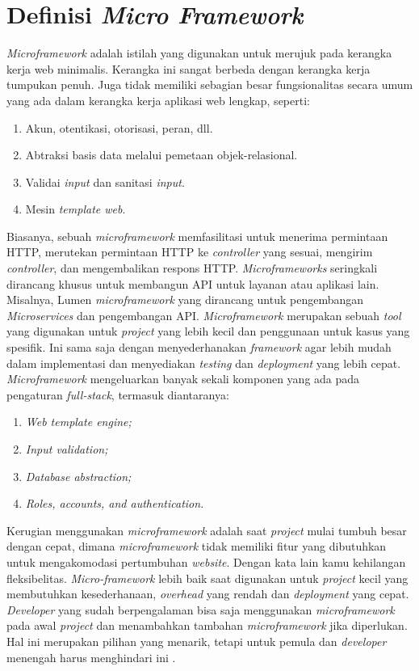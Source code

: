 ﻿\section{Definisi \textit{Micro Framework}}

\textit{Microframework} adalah istilah yang digunakan untuk merujuk pada kerangka kerja web minimalis. Kerangka ini sangat berbeda dengan kerangka kerja tumpukan penuh. Juga tidak memiliki sebagian besar fungsionalitas secara umum yang ada dalam kerangka kerja aplikasi web lengkap, seperti:
\begin{enumerate}
\item Akun, otentikasi, otorisasi, peran, dll.
\item Abtraksi basis data melalui pemetaan objek-relasional.
\item Validai  \textit{input} dan sanitasi \textit{input}.
\item Mesin \textit{template web}.
\end{enumerate}

Biasanya, sebuah \textit{microframework} memfasilitasi untuk menerima permintaan HTTP, merutekan permintaan HTTP ke \textit{controller} yang sesuai, mengirim \textit{controller}, dan mengembalikan respons HTTP. \textit{Microframeworks} seringkali dirancang khusus untuk membangun API untuk layanan atau aplikasi lain. Misalnya, Lumen \textit{microframework} yang dirancang untuk pengembangan \textit{Microservices} dan pengembangan API. \textit{Microframework} merupakan sebuah \textit{tool} yang digunakan untuk \textit{project} yang lebih kecil dan penggunaan untuk kasus yang spesifik. Ini sama saja dengan menyederhanakan \textit{framework} agar lebih mudah dalam implementasi dan menyediakan \textit{testing} dan \textit{deployment} yang lebih cepat. \textit{Microframework} mengeluarkan banyak sekali komponen yang ada pada pengaturan \textit{full-stack}, termasuk diantaranya:
\begin{enumerate}
\item \textit{Web template engine;}
\item \textit{Input validation;}
\item \textit{Database abstraction;}
\item \textit{Roles, accounts, and authentication.}
\end{enumerate}

Kerugian menggunakan  \textit{microframework} adalah saat  \textit{project} mulai tumbuh besar dengan cepat, dimana  \textit{microframework} tidak memiliki fitur yang dibutuhkan untuk mengakomodasi pertumbuhan  \textit{website}. Dengan kata lain kamu kehilangan fleksibelitas.  \textit{Micro-framework} lebih baik saat digunakan untuk  \textit{project} kecil yang membutuhkan kesederhanaan,  \textit{overhead} yang rendah dan  \textit{deployment} yang cepat.  \textit{Developer} yang sudah berpengalaman bisa saja menggunakan  \textit{microframework} pada awal  \textit{project} dan menambahkan tambahan  \textit{microframework} jika diperlukan. Hal ini merupakan pilihan yang menarik, tetapi untuk pemula dan  \textit{developer} menengah harus menghindari ini \cite{fadhilnet}.

